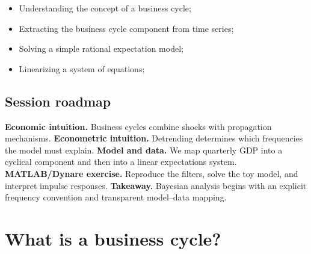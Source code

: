 \documentclass[a4paper,12pt]{article}%
\begin{document}
\FRONTPAGE%

\vspace{4ex}
\begin{myobjs}%


\begin{itemize}
\item Understanding the concept of a business cycle;

\item Extracting the business cycle component from time series;

\item Solving a simple rational expectation model;

\item Linearizing a system of equations;
\end{itemize}

%

\end{myobjs}%

\subsection*{Session roadmap}
\textbf{Economic intuition.} Business cycles combine shocks with propagation
mechanisms. \textbf{Econometric intuition.} Detrending determines which
frequencies the model must explain. \textbf{Model and data.} We map quarterly
GDP into a cyclical component and then into a linear expectations system.
\textbf{MATLAB/Dynare exercise.} Reproduce the filters, solve the toy model,
and interpret impulse responses. \textbf{Takeaway.} Bayesian analysis begins
with an explicit frequency convention and transparent model--data mapping.


\newpage

\section{What is a business cycle?}
\end{document}
